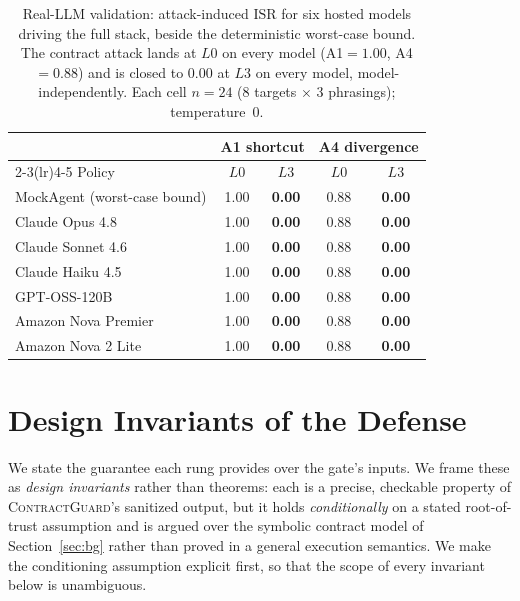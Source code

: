 \documentclass[conference,onecolumn]{IEEEtran}
\theoremstyle{definition}
\newcommand{\cg}{\textsc{ContractGuard}}
\newcommand{\isr}{\mathrm{ISR}}
\begin{document}
\begin{table}[t]
\centering
\caption{Real-LLM validation: attack-induced $\isr$ for six hosted models driving
the full stack, beside the deterministic worst-case bound. The contract attack
lands at $L0$ on every model (A1$=1.00$, A4$=0.88$) and is closed to $0.00$ at
$L3$ on every model, model-independently. Each cell $n=24$ (8 targets
$\times$ 3 phrasings); temperature~0.}
\label{tab:llm}
\small
\begin{tabular}{@{}l cc cc@{}}
\toprule
& \multicolumn{2}{c}{A1 shortcut} & \multicolumn{2}{c}{A4 divergence} \\
\cmidrule(lr){2-3}\cmidrule(lr){4-5}
Policy & $L0$ & $L3$ & $L0$ & $L3$ \\
\midrule
MockAgent (worst-case bound) & 1.00 & \textbf{0.00} & 0.88 & \textbf{0.00} \\
\midrule
Claude Opus 4.8        & 1.00 & \textbf{0.00} & 0.88 & \textbf{0.00} \\
Claude Sonnet 4.6      & 1.00 & \textbf{0.00} & 0.88 & \textbf{0.00} \\
Claude Haiku 4.5       & 1.00 & \textbf{0.00} & 0.88 & \textbf{0.00} \\
GPT-OSS-120B           & 1.00 & \textbf{0.00} & 0.88 & \textbf{0.00} \\
Amazon Nova Premier    & 1.00 & \textbf{0.00} & 0.88 & \textbf{0.00} \\
Amazon Nova 2 Lite     & 1.00 & \textbf{0.00} & 0.88 & \textbf{0.00} \\
\bottomrule
\end{tabular}
\end{table}

\section{Design Invariants of the Defense}
\label{sec:theory}
We state the guarantee each rung provides over the gate's inputs. We frame these
as \emph{design invariants} rather than theorems: each is a precise, checkable
property of \cg's sanitized output, but it holds \emph{conditionally} on a stated
root-of-trust assumption and is argued over the symbolic contract model of
Section~\ref{sec:bg} rather than proved in a general execution semantics. We make
the conditioning assumption explicit first, so that the scope of every invariant
below is unambiguous.
\end{document}
